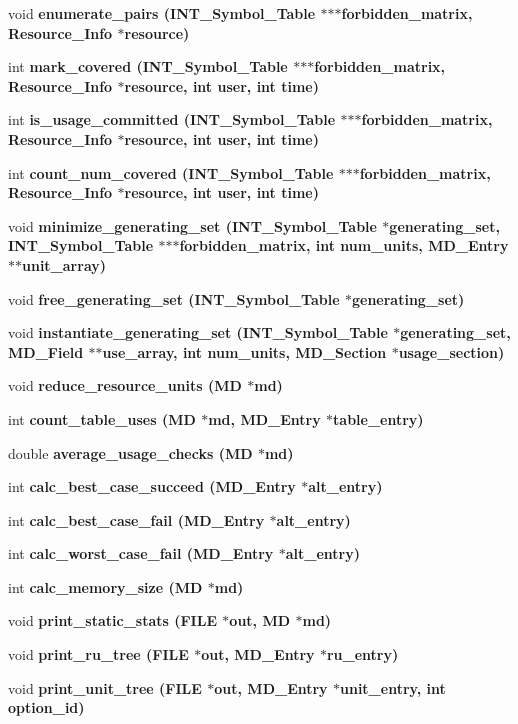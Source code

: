 \begin{CompactItemize}
void \bf{enumerate\_\-pairs} (\bf{INT\_\-Symbol\_\-Table} $\ast$$\ast$$\ast$forbidden\_\-matrix, \bf{Resource\_\-Info} $\ast$resource)
\item 
int \bf{mark\_\-covered} (\bf{INT\_\-Symbol\_\-Table} $\ast$$\ast$$\ast$forbidden\_\-matrix, \bf{Resource\_\-Info} $\ast$resource, int user, int time)
\item 
int \bf{is\_\-usage\_\-committed} (\bf{INT\_\-Symbol\_\-Table} $\ast$$\ast$$\ast$forbidden\_\-matrix, \bf{Resource\_\-Info} $\ast$resource, int user, int time)
\item 
int \bf{count\_\-num\_\-covered} (\bf{INT\_\-Symbol\_\-Table} $\ast$$\ast$$\ast$forbidden\_\-matrix, \bf{Resource\_\-Info} $\ast$resource, int user, int time)
\item 
void \bf{minimize\_\-generating\_\-set} (\bf{INT\_\-Symbol\_\-Table} $\ast$generating\_\-set, \bf{INT\_\-Symbol\_\-Table} $\ast$$\ast$$\ast$forbidden\_\-matrix, int num\_\-units, \bf{MD\_\-Entry} $\ast$$\ast$unit\_\-array)
\item 
void \bf{free\_\-generating\_\-set} (\bf{INT\_\-Symbol\_\-Table} $\ast$generating\_\-set)
\item 
void \bf{instantiate\_\-generating\_\-set} (\bf{INT\_\-Symbol\_\-Table} $\ast$generating\_\-set, \bf{MD\_\-Field} $\ast$$\ast$use\_\-array, int num\_\-units, \bf{MD\_\-Section} $\ast$usage\_\-section)
\item 
void \bf{reduce\_\-resource\_\-units} (\bf{MD} $\ast$md)
\item 
int \bf{count\_\-table\_\-uses} (\bf{MD} $\ast$md, \bf{MD\_\-Entry} $\ast$table\_\-entry)
\item 
double \bf{average\_\-usage\_\-checks} (\bf{MD} $\ast$md)
\item 
int \bf{calc\_\-best\_\-case\_\-succeed} (\bf{MD\_\-Entry} $\ast$alt\_\-entry)
\item 
int \bf{calc\_\-best\_\-case\_\-fail} (\bf{MD\_\-Entry} $\ast$alt\_\-entry)
\item 
int \bf{calc\_\-worst\_\-case\_\-fail} (\bf{MD\_\-Entry} $\ast$alt\_\-entry)
\item 
int \bf{calc\_\-memory\_\-size} (\bf{MD} $\ast$md)
\item 
void \bf{print\_\-static\_\-stats} (FILE $\ast$out, \bf{MD} $\ast$md)
\item 
void \bf{print\_\-ru\_\-tree} (FILE $\ast$out, \bf{MD\_\-Entry} $\ast$ru\_\-entry)
\item 
void \bf{print\_\-unit\_\-tree} (FILE $\ast$out, \bf{MD\_\-Entry} $\ast$unit\_\-entry, int option\_\-id)

\end{CompactItemize}
